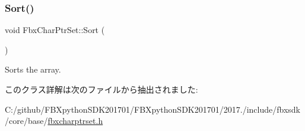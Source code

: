 \mbox{\label{class_fbx_char_ptr_set_a54d7c3c3b927eb0040f0235b5aaff717}} 
\subsubsection{\texorpdfstring{Sort()}{Sort()}}
{\footnotesize\ttfamily void Fbx\+Char\+Ptr\+Set\+::\+Sort (\begin{DoxyParamCaption}{ }\end{DoxyParamCaption})}



Sorts the array. 



このクラス詳解は次のファイルから抽出されました\+:\begin{DoxyCompactItemize}
\item 
C\+:/github/\+F\+B\+Xpython\+S\+D\+K201701/\+F\+B\+Xpython\+S\+D\+K201701/2017./include/fbxsdk/core/base/\hyperlink{fbxcharptrset_8h}{fbxcharptrset.\+h}\end{DoxyCompactItemize}
